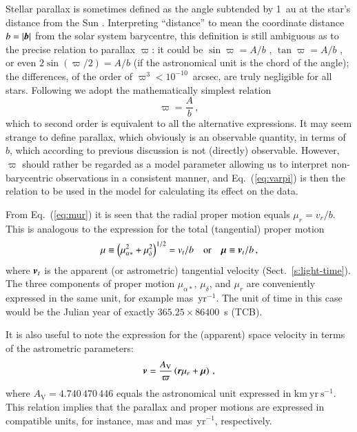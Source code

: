 \documentclass{aa}
\def\vec#1{\ensuremath{\mathchoice{\mbox{\boldmath$\displaystyle#1$}}
{\mbox{\boldmath$\textstyle#1$}}
{\mbox{\boldmath$\scriptstyle#1$}}
{\mbox{\boldmath$\scriptscriptstyle#1$}}}}
\begin{document}
Stellar parallax is sometimes defined as the angle subtended by 1~au at the star's distance
from the Sun \citep[e.g.][]{2001eaa}. Interpreting ``distance'' to mean the coordinate
distance $b=\left|\vec{b}\right|$ from the solar system barycentre, this definition
is still ambiguous as to the precise relation to parallax $\varpi$: it could be
$\sin\varpi=A/b$ \citep{murray1983}, $\tan\varpi=A/b$ \citep{bm1998}, or
even $2\sin(\varpi/2)=A/b$ (if the astronomical unit is the chord of the angle);
the differences, of the order of $\varpi^3<10^{-10}$~arcsec,
are truly negligible for all stars. Following \citet{klioner2003} we adopt the
mathematically simplest relation
\begin{equation}\label{eq:varpi}
\varpi = \frac{A}{b} \, ,
\end{equation}
which to second order is equivalent to all the alternative expressions.
It may seem strange to
define parallax, which obviously is an observable quantity, in terms of $b$, which according to
previous discussion is not (directly) observable. However, $\varpi$ should rather be regarded
as a model parameter allowing us to interpret non-barycentric observations in a consistent
manner, and Eq.~(\ref{eq:varpi}) is then the relation to be used in the model for calculating
its effect on the data.

From Eq.~(\ref{eq:mur}) it is seen that the radial proper motion equals $\mu_r=v_r/b$.
This is analogous to the expression for the total (tangential) proper motion
\begin{equation}\label{eq:mut}
\mu \equiv \left(\mu_{\alpha*}^2+\mu_\delta^2\right)^{1/2} = v_t/b
\quad\mbox{or}\quad\vec{\mu}\equiv\vec{v}_t/b \, ,
\end{equation}
where $\vec{v}_t$ is the apparent (or astrometric) tangential velocity (Sect.~\ref{s:light-time}).
The three components of proper motion
$\mu_{\alpha*}$, $\mu_\delta$, and $\mu_r$ are conveniently expressed in the
same unit, for example mas~yr$^{-1}$. The unit of time in this case would be the
Julian year of exactly $365.25\times 86400$~s (TCB).

It is also useful to note the expression for the (apparent) space velocity in terms of the astrometric parameters:
\begin{equation}\label{eq:vel-mu}
  \vec{v}=\frac{A_\mathrm{V}}{\varpi}\left(\vec{r}\mu_r+\vec{\mu}\right)\,,
\end{equation}
where $A_\mathrm{V}=4.740\,470\,446$ equals the astronomical unit expressed in $\mathrm{km}\ \mathrm{yr}\ \mathrm{s}^{-1}$. This relation implies that the parallax and proper motions are expressed in compatible units, for instance, mas and mas~yr$^{-1}$, respectively.
\end{document}
